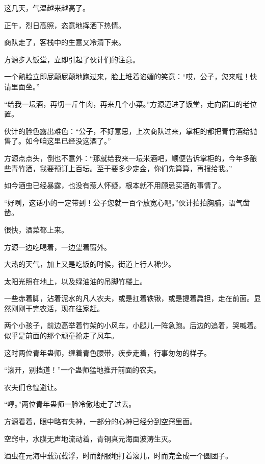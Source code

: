 
\begin{this_body}



这几天，气温越来越高了。

正午，烈日高照，恣意地挥洒下热情。

商队走了，客栈中的生意又冷清下来。

方源步入饭堂，立即引起了伙计们的注意。

一个熟脸立即屁颠屁颠地跑过来，脸上堆着谄媚的笑意：“哎，公子，您来啦！快请里面坐。”

“给我一坛酒，再切一斤牛肉，再来几个小菜。”方源迈进了饭堂，走向窗口的老位置。

伙计的脸色露出难色：“公子，不好意思，上次商队过来，掌柜的都把青竹酒给抛售了。如今咱这里已经没这酒了。”

方源点点头，倒也不意外：“那就给我来一坛米酒吧，顺便告诉掌柜的，今年多酿些青竹酒，我要预订上百坛。至于要多少定金，你们先算算，再报给我。”

如今酒虫已经暴露，也没有惹人怀疑，根本就不用顾忌买酒的事情了。

“好咧，这话小的一定带到！公子您就一百个放宽心吧。”伙计拍拍胸脯，语气凿凿。

很快，酒菜都上来。

方源一边吃喝着，一边望着窗外。

大热的天气，加上又是吃饭的时候，街道上行人稀少。

太阳光照在地上，以及绿油油的吊脚竹楼上。

一些赤着脚，沾着泥水的凡人农夫，或是扛着铁锹，或是提着扁担，走在前面。显然刚刚干完农活，现在往家赶。

两个小孩子，前边高举着竹架的小风车，小腿儿一阵急跑。后边的追着，哭喊着。似乎是前面的那个顽童抢走了风车。

这时两位青年蛊师，缠着青色腰带，疾步走着，行事匆匆的样子。

“滚开，别挡道！”一个蛊师猛地推开前面的农夫。

农夫们仓惶避让。

“哼。”两位青年蛊师一脸冷傲地走了过去。

方源看着，眼中略有失神，一部分的心神已经分到空窍里面。

空窍中，水膜无声地流动着，青铜真元海面波涛生灭。

酒虫在元海中载沉载浮，时而舒服地打着滚儿，时而完全成一个圆团子。


\end{this_body}
